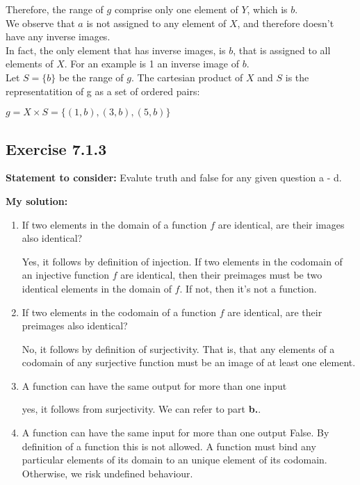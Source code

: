 \documentclass{report}
\newcommand{\cent}[1]{\begin{center}#1\end{center}}
\newcommand{\assignmentDescription}{\textbf{Statement to consider: }}
\newcommand{\solution}{\textbf{My solution: }}
\newcommand{\QED}{\boxed{}}
\newcommand{\Exercise}[1]{\subsection{Exercise #1}}
\newcommand{\defaultEnumerateLabel}{\textbf{\alph*.}}
\begin{document}
 	Therefore, the range of $g$ comprise only one element of $Y$, which is $b$.\\
 	
 	We observe that $a$ is not assigned to any element of $X$, and therefore doesn't have any inverse images.\\
 	
 	In fact, the only element that has inverse images, is $b$, that is assigned to all elements of $X$. For an example is 1 an inverse image of $b$. \\
 	
 	Let $S = \{b\}$ be the range of $g$. The cartesian product of $X$ and $S$ is the representatition of g as a set of ordered pairs:
 	
 	\cent{$g = X \times S = \{(1,b),(3,b),(5,b)\}$}
 	
 	\QED
 	
 	\Exercise{7.1.3}
 	\assignmentDescription
 	Evalute truth and false for any given question a - d.
 	
 	\solution
 	
 	\begin{enumerate}[label=\defaultEnumerateLabel]
 		\item If two elements in the domain of a function $f$ are identical, are their images also identical?
 		
 		Yes, it follows by definition of injection. If two elements in the codomain of an injective  function $f$ are identical, then their preimages must be two identical elements in the domain of $f$. If not, then it's not a function.
 		
 		\item If two elements in the codomain of a function $f$ are identical, are their preimages also identical?
 		
 		No, it follows by definition of surjectivity. That is, that any elements of a codomain of any surjective function must be an image of at least one element. 
 		
 		\item A function can have the same output for more than one input
 		
 		yes, it follows from surjectivity. We can refer to part \textbf{b.}.
 		
 		\item A function can have the same input for more than one output
 		False. By definition of a function this is not allowed. A function must bind any particular elements of its domain to an unique element of its codomain. Otherwise, we risk undefined behaviour.
 	\end{enumerate}
 
\end{document}

